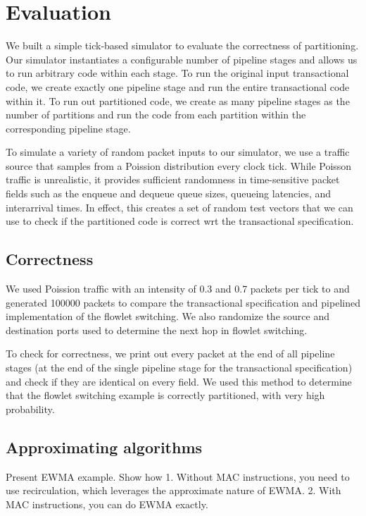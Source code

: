 \section{Evaluation}
\label{s:evaluation}

We built a simple tick-based simulator to evaluate the correctness of
partitioning. Our simulator instantiates a configurable number of pipeline
stages and allows us to run arbitrary code within each stage. To run the
original input transactional code, we create exactly one pipeline stage and run
the entire transactional code within it. To run out partitioned code, we create
as many pipeline stages as the number of partitions and run the code from each
partition within the corresponding pipeline stage.

To simulate a variety of random packet inputs to our simulator, we use a
traffic source that samples from a Poission distribution every clock tick.
While Poisson traffic is unrealistic, it provides sufficient randomness in
time-sensitive packet fields such as the enqueue and dequeue queue sizes,
queueing latencies, and interarrival times. In effect, this creates a set of
random test vectors that we can use to check if the partitioned code is correct
wrt the transactional specification.

\subsection{Correctness}
\label{ss:correctness}

We used Poission traffic with an intensity of 0.3 and 0.7 packets per tick to
and generated 100000 packets to compare the transactional specification and
pipelined implementation of the flowlet switching. We also randomize the source
and destination ports used to determine the next hop in flowlet switching.

To check for correctness, we print out every packet at the end of all pipeline
stages (at the end of the single pipeline stage for the transactional
specification) and check if they are identical on every field. We used this
method to determine that the flowlet switching example is correctly
partitioned, with very high probability.

\subsection{Approximating algorithms}
Present EWMA example. Show how
1. Without MAC instructions, you need to use recirculation, which leverages the approximate nature of EWMA.
2. With MAC instructions, you can do EWMA exactly.
